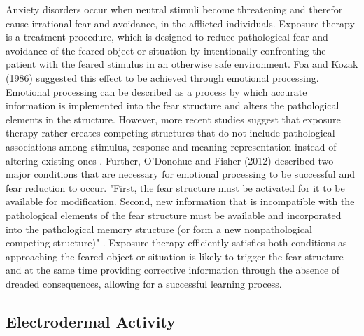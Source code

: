 Anxiety disorders occur when neutral stimuli become threatening and therefor cause irrational fear and avoidance, in the afflicted individuals. Exposure therapy is a treatment procedure, which is designed to reduce pathological fear and avoidance of the feared object or situation by intentionally confronting the patient with the feared stimulus in an otherwise safe environment. Foa and Kozak (1986) suggested this effect to be achieved through emotional processing. Emotional processing can be described as a process by which accurate information is implemented into the fear structure and alters the pathological elements in the structure. However, more recent studies suggest that exposure therapy rather creates competing structures that do not include pathological associations among stimulus, response and meaning representation instead of altering existing ones \cite{o2012cognitive}. Further, O'Donohue and Fisher (2012) described two major conditions that are necessary for emotional processing to be successful and fear reduction to occur. "First, the fear structure must be activated for it to be available for modification. Second, new information that is incompatible with the pathological elements of the fear structure must be available and incorporated into the pathological memory structure (or form a new nonpathological competing structure)" \cite{o2012cognitive}. Exposure therapy efficiently satisfies both conditions as approaching the feared object or situation is likely to trigger the fear structure and at the same time  providing corrective information through the absence of dreaded consequences, allowing for a successful learning process.


\subsection{Electrodermal Activity}
%




